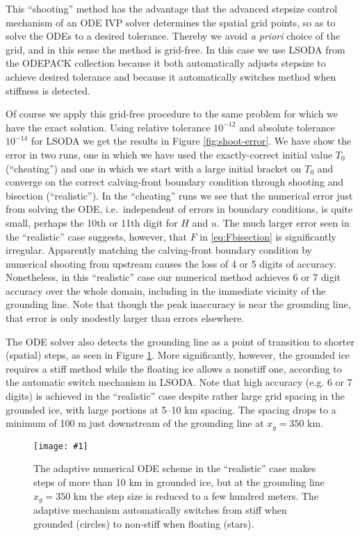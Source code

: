 \documentclass[review,letterpaper]{igs}
\newcommand{\onecol}[1]{\texttt{[image: \#1]}}
\begin{document}
This ``shooting'' method has the advantage that the advanced stepsize control mechanism of an ODE IVP solver determines the spatial grid points, so as to solve the ODEs to a desired tolerance.  Thereby we avoid \emph{a priori} choice of the grid, and in this sense the method is grid-free.  In this case we use LSODA from the ODEPACK collection \citep{Hindmarsh1983ODEPACK} because it both automatically adjusts stepsize to achieve desired tolerance and because it automatically switches method when stiffness \citep[section 16.6]{Pressetal} is detected.

Of course we apply this grid-free procedure to the same problem for which we have the exact solution.  Using relative tolerance $10^{-12}$ and absolute tolerance $10^{-14}$ for LSODA we get the results in Figure \ref{fig:shoot-error}.  We have show the error in two runs, one in which we have used the exactly-correct initial value $T_0$ (``cheating'') and one in which we start with a large initial bracket on $T_0$ and converge on the correct calving-front boundary condition through shooting and bisection (``realistic'').  In the ``cheating'' runs we see that the numerical error just from solving the ODE, i.e.~independent of errors in boundary conditions, is quite small, perhaps the 10th or 11th digit for $H$ and $u$.  The much larger error seen in the ``realistic'' case suggests, however, that $F$ in \eqref{eq:Fbisection} is significantly irregular.  Apparently matching the calving-front boundary condition by numerical shooting from upstream causes the loss of 4 or 5 digits of accuracy.  Nonetheless, in this ``realistic'' case our numerical method achieves 6 or 7 digit accuracy over the whole domain, including in the immediate vicinity of the grounding line.  Note that though the peak inaccuracy is near the grounding line, that error is only modestly larger than errors elsewhere.

The ODE solver also detects the grounding line as a point of transition to shorter (spatial) steps, as seen in Figure \ref{fig:shoot-dt-adaptive}.  More significantly, however, the grounded ice requires a stiff method while the floating ice allows a nonstiff one, according to the automatic switch mechanism in LSODA.  Note that high accuracy (e.g. 6 or 7 digits) is achieved in the ``realistic'' case despite rather large grid spacing in the grounded ice, with large portions at 5--10 km spacing.  The spacing drops to a minimum of 100 m just downstream of the grounding line at $x_g=350$ km.

\begin{figure}[ht]
\onecol{exactmarine-dt-adaptive}
\caption{The adaptive numerical ODE scheme in the ``realistic'' case makes steps of more than 10 km in grounded ice, but at the grounding line $x_g=350$ km the step size is reduced to a few hundred meters.  The adaptive mechanism automatically switches from stiff when grounded (circles) to non-stiff when floating (stars).} \label{fig:shoot-dt-adaptive}
\end{figure}
\end{document}
